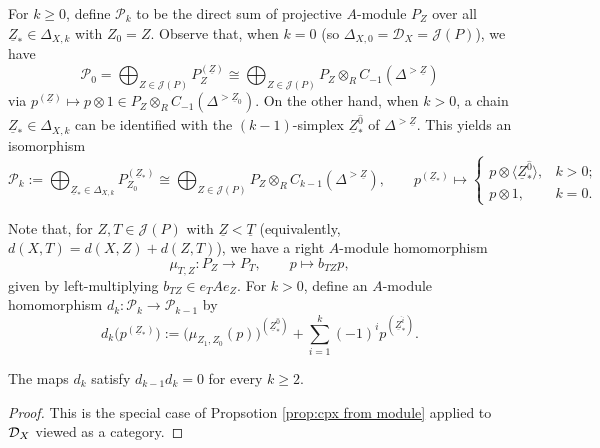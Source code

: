 \documentclass[a4paper,leqno]{amsart}
\begin{document}
For $k\geq0$, define $\mathcal{P}_k$ to be the direct sum of projective $A$-module $P_Z$ over all $\underline{Z}_\ast\in\Delta_{X,k}$ with $Z_0 = Z$. Observe that, when $k=0$ (so $\Delta_{X,0}=\mathcal{D}_X=\mathcal{J}(P)$), we have
\[
\mathcal{P}_0 = \bigoplus_{Z\in\mathcal{J}(P)} P_Z^{(\underline{Z})} \cong \bigoplus_{Z\in\mathcal{J}(P)} P_Z\otimes_{R} C_{-1}(\Delta^{>\underline{Z}})\]
via $p^{(\underline{Z})}\mapsto p\otimes 1\in P_Z\otimes_{R}C_{-1}(\Delta^{>\underline{Z}_0})$. On the other hand, when $k>0$, a chain $\underline{Z}_\ast \in \Delta_{X,k}$ can be identified with the $(k-1)$-simplex $\underline{Z}_\ast^{\widehat{0}}$ of $\Delta^{>\underline{Z}}$. This yields an isomorphism
\begin{equation}
\mathcal P_k := \bigoplus_{\underline{Z}_\ast\in \Delta_{X,k}} P_{Z_0}^{(\underline{Z}_\ast)} \cong
\bigoplus_{Z\in\mathcal J(P)}
P_Z\otimes_{R}C_{k-1}(\Delta^{>\underline{Z}}), \qquad  p^{(\underline{Z}_\ast)} \mapsto \begin{cases}
    p\otimes \langle \underline{Z}_\ast^{\widehat{0}} \rangle, & k>0;\\ p\otimes 1, & k=0.
\end{cases}
\label{eq:candidate-terms}
\end{equation}

Note that, for $Z,T\in\mathcal J(P)$ with $\underline{Z}<\underline{T}$ (equivalently, $d(X,T)=d(X,Z)+d(Z,T)$), we have a right $A$-module homomorphism
$$\mu_{T,Z}\colon P_Z\longrightarrow P_T, \qquad p\longmapsto b_{TZ}p,$$ given by left-multiplying $b_{TZ}\in e_TA e_Z$.
For $k>0$, define an $A$-module homomorphism $d_k\colon\mathcal P_k\longrightarrow\mathcal P_{k-1}$ by
\begin{equation}
 d_k\bigl(p^{(\underline{Z}_\ast)}\bigr)
:=
\bigl(\mu_{Z_1,Z_0}(p)\bigr)^{(\underline{Z}_\ast^{\widehat{0}})}
+ \sum_{i=1}^k
(-1)^i  p^{(\underline{Z}_\ast^{\widehat{i}})}.
 \label{eq:candidate-differential}
\end{equation}

\begin{prop}\label{prop:resolution-differential}
The maps $d_k$ satisfy $d_{k-1}d_k=0$ for every $k\geq2$.
\end{prop}
\begin{proof}
This is the special case of Propsotion \ref{prop:cpx from module} applied to $\mathcal D_X$ viewed as a category.
\end{proof}
\end{document}
